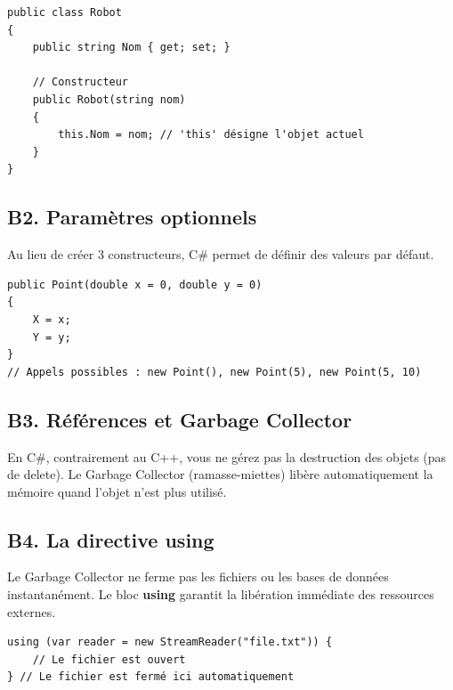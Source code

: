 \begin{verbatim}
public class Robot
{
    public string Nom { get; set; }

    // Constructeur
    public Robot(string nom)
    {
        this.Nom = nom; // 'this' désigne l'objet actuel
    }
}
\end{verbatim}

\subsection*{B2. Paramètres optionnels}
{}
\noindent Au lieu de créer 3 constructeurs, C\# permet de définir des valeurs par défaut.

\vspace{0.5cm}

\begin{verbatim}
public Point(double x = 0, double y = 0) 
{
    X = x;
    Y = y;
}
// Appels possibles : new Point(), new Point(5), new Point(5, 10)
\end{verbatim}

\subsection*{B3. Références et Garbage Collector}
{}
\noindent En C\#, contrairement au C++, vous ne gérez pas la destruction des objets (pas de delete). Le Garbage Collector (ramasse-miettes) libère automatiquement la mémoire quand l'objet n'est plus utilisé.

\vspace{0.5cm}

\subsection*{B4. La directive using}
{}
\noindent Le Garbage Collector ne ferme pas les fichiers ou les bases de données instantanément. Le bloc \textbf{using} garantit la libération immédiate des ressources externes.

\begin{verbatim}
using (var reader = new StreamReader("file.txt")) {
    // Le fichier est ouvert
} // Le fichier est fermé ici automatiquement
\end{verbatim}

\vspace{0.5cm}

